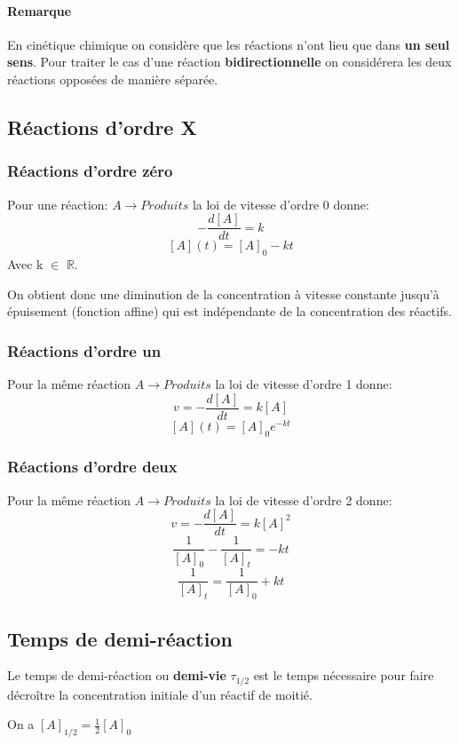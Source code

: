 \documentclass[10pt,a4paper]{book}
\newcommand{\R}{\mathbb{R}}
\begin{document}
\paragraph{Remarque} En cinétique chimique on considère que les réactions n'ont lieu que dans \textbf{un seul sens}. Pour traiter le cas d'une réaction \textbf{bidirectionnelle} on considérera les deux réactions opposées de manière séparée.

\subsection{Réactions d'ordre X}

\subsubsection{Réactions d'ordre zéro}

Pour une réaction: \(A \longrightarrow Produits\) la loi de vitesse d'ordre 0 donne:
\[-\frac{d[A]}{dt} = k\]
\[[A](t) = [A]_0 - kt\]
Avec k $\in$ $\R$. \par
On obtient donc une diminution de la concentration à vitesse constante jusqu'à épuisement (fonction affine) qui est indépendante de la concentration des réactifs.

\subsubsection{Réactions d'ordre un}

Pour la même réaction \(A \longrightarrow Produits\) la loi de vitesse d'ordre 1 donne:
\[v = -\frac{d[A]}{dt} = k[A]\]
\[[A](t) = [A]_0e^{-kt}\]

\subsubsection{Réactions d'ordre deux}

Pour la même réaction \(A \longrightarrow Produits\) la loi de vitesse d'ordre 2 donne:
\[v = -\frac{d[A]}{dt} = k[A]^2\]
\[\frac{1}{[A]_0} - \frac{1}{[A]_t} = -kt\]
\[\frac{1}{[A]_t} = \frac{1}{[A]_0} + kt\]

\subsection{Temps de demi-réaction}

Le temps de demi-réaction ou \textbf{demi-vie} $\tau_{1/2}$ est le temps nécessaire pour faire décroître la concentration initiale d’un réactif de moitié. \par
On a \([A]_{1/2} = \frac{1}{2}[A]_0\)
\end{document}
